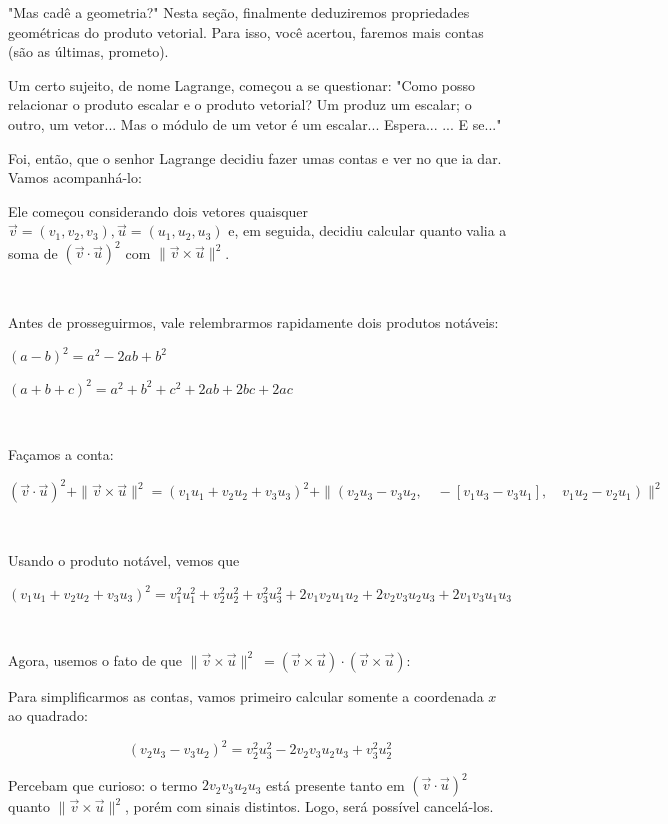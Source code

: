 "Mas cadê a geometria?" Nesta seção, finalmente deduziremos propriedades geométricas do produto vetorial. Para isso, você acertou, faremos mais contas (são as últimas, prometo).




Um certo sujeito, de nome Lagrange, começou a se questionar: "Como posso relacionar o produto escalar e o produto vetorial? Um produz um escalar; o outro, um vetor... Mas o módulo de um vetor é um escalar... Espera... ... E se..."

Foi, então, que o senhor Lagrange decidiu fazer umas contas e ver no que ia dar. Vamos acompanhá-lo:

Ele começou considerando dois vetores quaisquer \(\vec{v} = (v_1, v_2, v_3), \vec{u} = (u_1, u_2, u_3)\) e, em seguida, decidiu calcular quanto valia a soma de \((\vec{v} \cdot \vec{u})^2\) com \(\|\vec{v} \times \vec{u}\|^2\). 

 

Antes de prosseguirmos, vale relembrarmos rapidamente dois produtos notáveis: 

\((a-b)^2 = a^2 - 2ab + b^2\)

\((a + b + c)^2 = a^2 + b^2 + c^2 + 2ab + 2bc + 2ac\)

 

Façamos a conta:

\[
(\vec{v} \cdot \vec{u})^2 + \|\vec{v} \times \vec{u}\|^2 = (v_1u_1 + v_2u_2 + v_3u_3)^2 + \|(v_2u_3 - v_3u_2,\quad -[v_1u_3 - v_3u_1],\quad v_1u_2 - v_2u_1)\|^2
\]

 

Usando o produto notável, vemos que

\[
(v_1u_1 + v_2u_2 + v_3u_3)^2 = v_1^2u_1^2 + v_2^2u_2^2 + v_3^2u_3^2 + 2v_1v_2u_1u_2 + 2v_2v_3u_2u_3 + 2v_1v_3u_1u_3
\]

 

Agora, usemos o fato de que \(\|\vec{v} \times \vec{u}\|^2\ = (\vec{v} \times \vec{u}) \cdot (\vec{v} \times \vec{u})\):

Para simplificarmos as contas, vamos primeiro calcular somente a coordenada \(x\) ao quadrado:

\[
(v_2u_3 - v_3u_2)^2 = v_2^2u_3^2 - 2v_2v_3u_2u_3 + v_3^2u_2^2
\]

Percebam que curioso: o termo \(2v_2v_3u_2u_3\) está presente tanto em \((\vec{v} \cdot \vec{u})^2\) quanto \(\|\vec{v} \times \vec{u}\|^2\), porém com sinais distintos. Logo, será possível cancelá-los.

 

